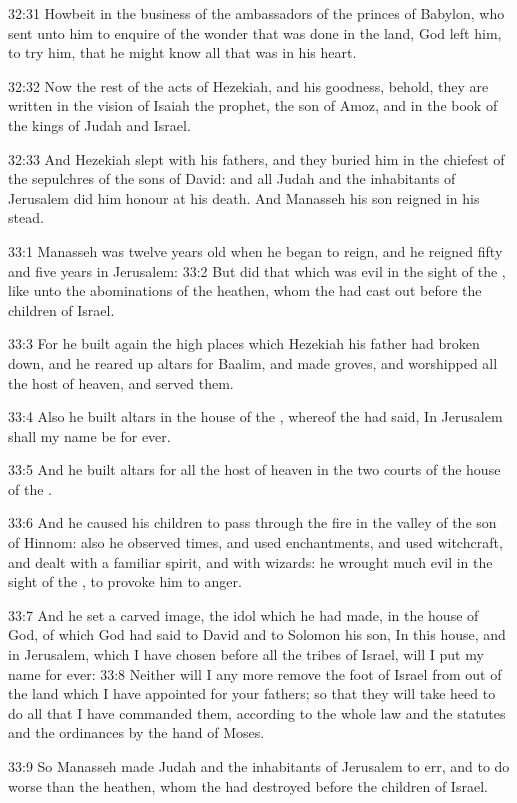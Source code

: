 32:31 Howbeit in the business of the ambassadors of the princes of Babylon, who sent unto him to enquire of the wonder that was done in the land, God left him, to try him, that he might know all that was in his heart.

32:32 Now the rest of the acts of Hezekiah, and his goodness, behold, they are written in the vision of Isaiah the prophet, the son of Amoz, and in the book of the kings of Judah and Israel.

32:33 And Hezekiah slept with his fathers, and they buried him in the chiefest of the sepulchres of the sons of David: and all Judah and the inhabitants of Jerusalem did him honour at his death. And Manasseh his son reigned in his stead.

33:1 Manasseh was twelve years old when he began to reign, and he reigned fifty and five years in Jerusalem: 33:2 But did that which was evil in the sight of the \LORD, like unto the abominations of the heathen, whom the \LORD had cast out before the children of Israel.

33:3 For he built again the high places which Hezekiah his father had broken down, and he reared up altars for Baalim, and made groves, and worshipped all the host of heaven, and served them.

33:4 Also he built altars in the house of the \LORD, whereof the \LORD had said, In Jerusalem shall my name be for ever.

33:5 And he built altars for all the host of heaven in the two courts of the house of the \LORD.

33:6 And he caused his children to pass through the fire in the valley of the son of Hinnom: also he observed times, and used enchantments, and used witchcraft, and dealt with a familiar spirit, and with wizards: he wrought much evil in the sight of the \LORD, to provoke him to anger.

33:7 And he set a carved image, the idol which he had made, in the house of God, of which God had said to David and to Solomon his son, In this house, and in Jerusalem, which I have chosen before all the tribes of Israel, will I put my name for ever: 33:8 Neither will I any more remove the foot of Israel from out of the land which I have appointed for your fathers; so that they will take heed to do all that I have commanded them, according to the whole law and the statutes and the ordinances by the hand of Moses.

33:9 So Manasseh made Judah and the inhabitants of Jerusalem to err, and to do worse than the heathen, whom the \LORD had destroyed before the children of Israel.

